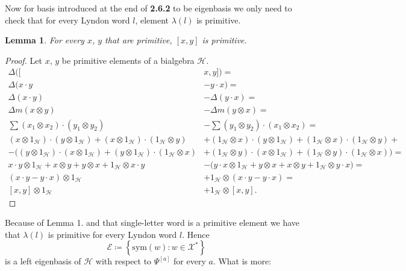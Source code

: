 \documentclass[a4paper, 12pt]{report}
\newtheorem{lemma}{Lemma}
\begin{document}
Now for basis introduced at the end of \textbf{2.6.2} to be eigenbasis we only need to check that for every Lyndon 
word $l$, element $\lambda(l)$ is primitive. 

\begin{lemma}
For every $x$, $y$ that are primitive, $[x, y]$ is primitive.
\end{lemma}

\begin{proof}
Let $x$, $y$ be primitive elements of a bialgebra $\mathcal{H}$.
\begin{align*}
\Delta([&x, y]) = \\ \Delta(x\cdot y &- y\cdot x) =\\ \Delta (x\cdot y) &- \Delta(y\cdot x) =\\ 
\Delta m(x \otimes y) &- \Delta m(y \otimes x) =\\ 
\sum (x_1 \otimes x_2) \cdot (y_1 \otimes y_2) &- \sum (y_1 \otimes y_2) \cdot (x_1 \otimes x_2) = \\
(x \otimes 1_\mathcal{H}) \cdot (y \otimes 1_\mathcal{H}) + (x \otimes 1_\mathcal{H}) \cdot (1_\mathcal{H} 
\otimes y) 
&+ (1_\mathcal{H} \otimes x) \cdot (y \otimes 1_\mathcal{H}) + (1_\mathcal{H} \otimes x) \cdot 
(1_\mathcal{H} \otimes y) + \\
- \Big((y \otimes 1_\mathcal{H}) \cdot (x \otimes 1_\mathcal{H}) + (y \otimes 1_\mathcal{H}) \cdot 
(1_\mathcal{H} \otimes x) 
&+ (1_\mathcal{H} \otimes y) \cdot (x \otimes 1_\mathcal{H}) + (1_\mathcal{H} \otimes y) \cdot 
(1_\mathcal{H} \otimes x) \Big) = \\
x \cdot y \otimes 1_\mathcal{H} + x \otimes y + y \otimes x + 1_\mathcal{H} \otimes x \cdot y 
&- \Big( y \cdot x \otimes 1_\mathcal{H} + y \otimes x + x \otimes y + 1_\mathcal{H} \otimes y \cdot x 
\Big) = \\
(x \cdot y - y \cdot x) \otimes 1_\mathcal{H} &+ 1_\mathcal{H} \otimes (x \cdot y - y \cdot x) = \\
[x, y] \otimes 1_\mathcal{H} &+ 1_\mathcal{H} \otimes [x, y].
\end{align*}

\end{proof}

Because of Lemma 1. and that single-letter word is a primitive element we have that $\lambda(l)$ is primitive 
for every Lyndon word $l$. Hence
\begin{equation*}
\mathcal{E} \coloneqq\left\{\mathrm{sym}(w) : w \in \mathcal{X}^*\right\}
\end{equation*}
is a left eigenbasis of $\mathcal{H}$ with respect to $\Psi^{[a]}$ for every $a$. What is more:
\end{document}
